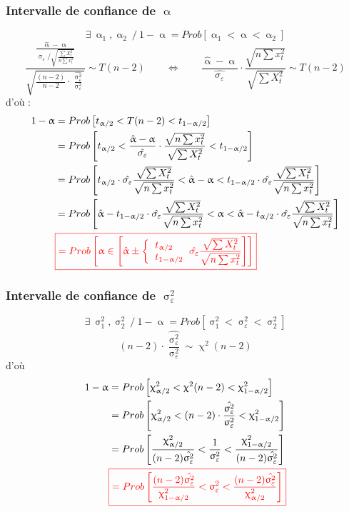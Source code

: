 \documentclass{article}
\newcommand{\halpha}{\hat{\upalpha}}
\newcommand{\sig}{\upsigma_\varepsilon^2}
\newcommand{\studn}{t_{\upalpha / 2}}
\newcommand{\studp}{t_{1 - \upalpha / 2}}
\newcommand{\chin}{\upchi_{\upalpha / 2}^2}
\newcommand{\chip}{\upchi_{1 - \upalpha / 2}^2}
\begin{document}
\subsubsection{Intervalle de confiance de \(\halpha\)}
\[\exists \: \upalpha_1, \upalpha_2 \: /  \: 1 - \upalpha = Prob [\upalpha_1 < \upalpha < \upalpha_2]\]
\[\frac{\frac{\halpha - \upalpha}{\upsigma_\varepsilon / \sqrt{\frac{\sum X_t^2}{n \sum x_t^2}}}}{\sqrt{\frac{(n-2)}{n-2} \cdot \frac{\hat{\sig}}{\sig}}} \sim T(n-2) \qquad \Leftrightarrow \qquad \frac{\halpha - \upalpha}{\hat{\sigma_\varepsilon}} \cdot \frac{\sqrt{n \sum x_t^2}}{\sqrt{\sum X_t^2}} \sim T(n-2) \]
d'où :
\begin{align*}
	1- \upalpha &= Prob\left[\studn < T(n-2) <\studp\right] \\
	&= Prob\left[\studn <  \frac{\halpha - \upalpha}{\hat{\sigma_\varepsilon}} \cdot \frac{\sqrt{n \sum x_t^2}}{\sqrt{\sum X_t^2}} <\studp\right] \\
	&= Prob\left[\studn \cdot \hat{\sigma_\varepsilon} \frac{\sqrt{\sum X_t^2}}{\sqrt{n \sum x_t^2}}<\halpha - \upalpha<\studp  \cdot \hat{\sigma_\varepsilon} \frac{\sqrt{\sum X_t^2}}{\sqrt{n \sum x_t^2}} \right] \\
	&= Prob\left[\halpha - \studp \cdot \hat{\sigma_\varepsilon} \frac{\sqrt{\sum X_t^2}}{\sqrt{n \sum x_t^2}}<\upalpha<\halpha - \studn  \cdot \hat{\sigma_\varepsilon} \frac{\sqrt{\sum X_t^2}}{\sqrt{n \sum x_t^2}} \right] \\
	&{\color{red} \boxed{= Prob\left[\upalpha \in \left[\halpha \pm \bigg\{\begin{tabular}{l} $\studn$ \\ $\studp$ \end{tabular}   \hat{\sigma_\varepsilon} \frac{\sqrt{\sum X_t^2}}{\sqrt{n \sum x_t^2}}  \right]\right]}}
\end{align*}
\subsubsection{Intervalle de confiance de \(\sig\)}
\[\exists \: \upsigma_1^2, \upsigma_2^2 \: /  \: 1 - \upalpha = Prob \left[\upsigma_1^2 < \sig <  \upsigma_2^2\right]\]
\[(n-2) \cdot \frac{\hat{\sig}}{\sig} \sim \upchi^2 (n-2)\]
d'où
\begin{align*}
	1 - \upalpha &= Prob\left[\chin<\upchi^2 (n-2)<\chip\right] \\
	&= Prob\left[\chin < (n-2) \cdot \frac{\hat{\sig}}{\sig} < \chip \right] \\
	&= Prob\left[\frac{\chin}{(n-2) \hat{\sig}}<\frac{1}{\sig}<\frac{\chip}{(n-2) \hat{\sig}}\right] \\
	&{\color{red} \boxed{= Prob \left[\frac{(n-2) \hat{\sig}}{\chip}<\sig<\frac{(n-2) \hat{\sig}}{\chin}\right]}}
\end{align*}
\end{document}
